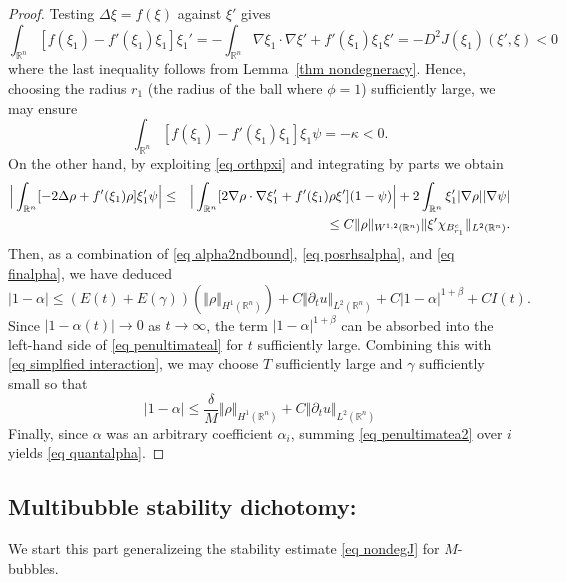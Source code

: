 \documentclass[11pt,letterpaper,reqno]{amsart}
\newcommand{\R}{\mathbb{R}}
\theoremstyle{plain}%
\theoremstyle{definition}
\numberwithin{equation}{section}
\numberwithin{figure}{section}
\begin{document}
\begin{proof}
Testing $\Delta \xi = f(\xi)$ against $\xi'$ gives 
$$\int_{\R^n}[f(\xi_1)-f'(\xi_1)\xi_1] \xi_1'  = - \int_{\R^n} \nabla \xi_1\cdot \nabla \xi' + f'(\xi_1)\xi_1\xi' =-D^2J(\xi_1)(\xi', \xi)<0$$
where the last inequality follows from Lemma~\ref{thm nondegneracy}. 
Hence, choosing the radius $r_1$ (the radius of the ball where $\phi=1$) sufficiently large, we may ensure
\begin{equation}\label{eq posrhsalpha}
    \int_{\R^n}[f(\xi_1)-f'(\xi_1)\xi_1] \xi_1 \psi = -\kappa<0.
\end{equation}
On the other hand, by exploiting \eqref{eq orthpxi} and integrating by parts we obtain
\begin{eqnarray}\notag
   \Big| \int_{\R^n} [- 2 \Delta \rho+f'(\xi_1) \rho] \xi_1' \psi \Big| &\leq& \Big|\int_{\R^n} [ 2 \nabla \rho \cdot \nabla \xi_1'+f'(\xi_1) \rho\xi'] (1- \psi)\Big|+ 2 \int_{\R^n} \xi_1' |\nabla \rho| |\nabla \psi|\\\label{eq finalpha}
   &&\leq C\Vert \rho\Vert_{W^{1,2}(\R^n)}\Vert \xi' \chi_{B_{r_1}^c}\Vert_{L^2(\R^n)}.
\end{eqnarray}
Then, as a combination of \eqref{eq alpha2ndbound}, \eqref{eq posrhsalpha}, and \eqref{eq finalpha}, we have deduced
\begin{equation}\label{eq penultimateal}
    |1-\alpha| \leq (E(t)+E(\gamma))(\Vert \rho\Vert_{H^1(\R^n)})+C\Vert \partial_t u\Vert_{L^2(\R^n)}+C|1-\alpha|^{1+\beta}+ CI(t).
\end{equation}
Since $|1-\alpha(t)|\to 0$ as $t\to\infty$, the term 
$|1-\alpha|^{1+\beta}$ can be absorbed into the left-hand side of \eqref{eq penultimateal} for $t$ sufficiently large. 
Combining this with \eqref{eq simplfied interaction}, we may choose $T$ sufficiently large and $\gamma$ sufficiently small so that
\begin{equation}\label{eq penultimatea2}
    |1-\alpha| \leq \frac{\delta}{M}\Vert \rho\Vert_{H^1(\R^n)}+C\Vert \partial_t u\Vert_{L^2(\R^n)}
\end{equation}
Finally, since $\alpha$ was an arbitrary coefficient $\alpha_i$, summing \eqref{eq penultimatea2} over $i$ yields \eqref{eq quantalpha}.
\end{proof}


\subsection{Multibubble stability dichotomy:} We start this part generalizeing the stability estimate \eqref{eq nondegJ} for $M$-bubbles.
\end{document}
